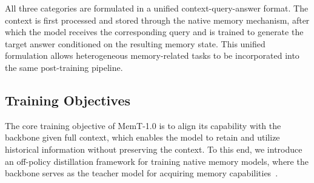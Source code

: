 All three categories are formulated in a unified context-query-answer format.
The context is first processed and stored through the native memory mechanism, after which the model receives the corresponding query and is trained to generate the target answer conditioned on the resulting memory state.
This unified formulation allows heterogeneous memory-related tasks to be incorporated into the same post-training pipeline.

\subsection{Training Objectives}
\label{sec:objectives}
The core training objective of MemT-1.0 is to align its capability with the backbone given full context, which enables the model to retain and utilize historical information without preserving the context.
To this end, we introduce an off-policy distillation framework for training native memory models, where the backbone serves as the teacher model for acquiring memory capabilities~\cite{hinton2015distillingknowledgeneuralnetwork}.

